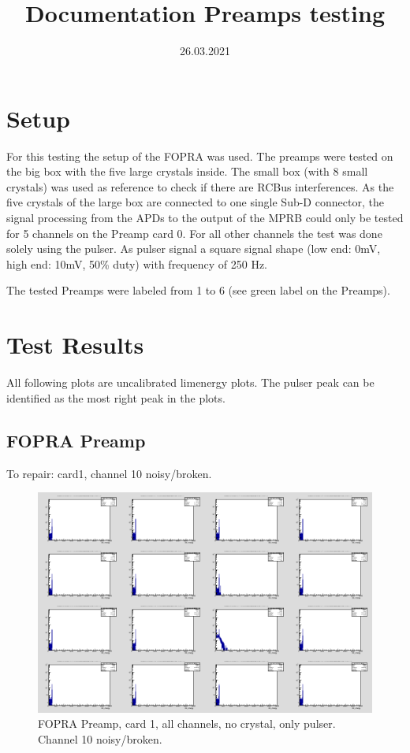 \documentclass{report}
\title{Documentation Preamps testing}
\date{26.03.2021}
\begin{document}
\maketitle




\section{Setup}
For this testing the setup of the FOPRA was used. The preamps were tested on the big box with the five large crystals inside. The small box (with 8 small crystals) was used as reference to check if there are RCBus interferences. As the five crystals of the large box are connected to one single Sub-D connector, the signal processing from the APDs to the output of the MPRB could only be tested for 5 channels on the Preamp card 0. For all other channels the test was done solely using the pulser. As pulser signal a square signal shape (low end: 0mV, high end: 10mV, 50\% duty) with frequency of 250 Hz.

The tested Preamps were labeled from 1 to 6 (see green label on the Preamps).

\newpage

\section{Test Results} \label{documentclasses}
All following plots are uncalibrated lim\textunderscore energy plots. The pulser peak can be identified as the most right peak in the plots. 
\subsection{FOPRA Preamp}
To repair: card1, channel 10 noisy/broken.
\begin{figure}[!htb]
  \includegraphics[width=\linewidth]{fopra_preamp_lim_energy_card1_all.png}
  \caption{FOPRA Preamp, card 1, all channels, no crystal, only pulser. Channel 10 noisy/broken.}
\end{figure}
\end{document}
